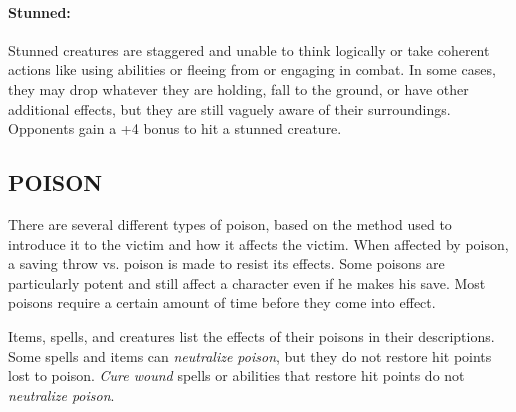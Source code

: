 \begin{multicols}{2}
\paragraph{Stunned:} Stunned creatures are staggered and unable to think logically or take coherent actions like using abilities or fleeing from or engaging in combat. In some cases, they may drop whatever they are holding, fall to the ground, or have other additional effects, but they are still vaguely aware of their surroundings.  Opponents gain a +4 bonus to hit a stunned creature. 

\subsection{POISON}

There are several different types of poison, based on the method used to introduce it to the victim and how it affects the victim.  When affected by poison, a saving throw vs. poison is made to resist its effects.  Some poisons are particularly potent and still affect a character even if he makes his save.  Most poisons require a certain amount of time before they come into effect.

Items, spells, and creatures list the effects of their poisons in their descriptions.  Some spells and items can \textit{neutralize poison}, but they do not restore hit points lost to poison.  \textit{Cure wound} spells or abilities that restore hit points do not \textit{neutralize poison}.

\noindent
\begin{minipage}{\columnwidth}


\end{minipage}
\end{multicols}
